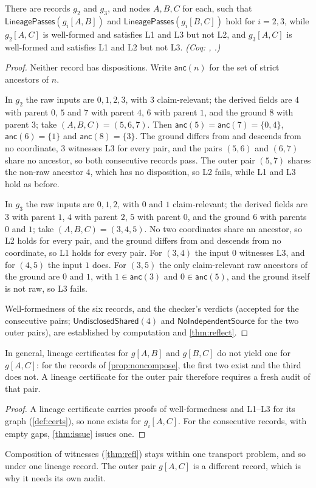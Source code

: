 \begin{prop}\label{prop:noncompose}
There are records $g_2$ and $g_3$, and nodes $A,B,C$ for each, such that $\mathsf{LineagePasses}(g_i[A,B])$ and $\mathsf{LineagePasses}(g_i[B,C])$ hold for $i = 2,3$, while $g_2[A,C]$ is well-formed and satisfies L1 and L3 but not L2, and $g_3[A,C]$ is well-formed and satisfies L1 and L2 but not L3. \emph{(Coq: , .)}
\end{prop}
\begin{proof}
Neither record has dispositions. Write $\mathsf{anc}(n)$ for the set of strict ancestors of $n$.

In $g_2$ the raw inputs are $0,1,2,3$, with $3$ claim-relevant; the derived fields are $4$ with parent $0$, $5$ and $7$ with parent $4$, $6$ with parent $1$, and the ground $8$ with parent $3$; take $(A,B,C) = (5,6,7)$. Then $\mathsf{anc}(5) = \mathsf{anc}(7) = \{0,4\}$, $\mathsf{anc}(6) = \{1\}$ and $\mathsf{anc}(8) = \{3\}$. The ground differs from and descends from no coordinate, $3$ witnesses L3 for every pair, and the pairs $(5,6)$ and $(6,7)$ share no ancestor, so both consecutive records pass. The outer pair $(5,7)$ shares the non-raw ancestor $4$, which has no disposition, so L2 fails, while L1 and L3 hold as before.

In $g_3$ the raw inputs are $0,1,2$, with $0$ and $1$ claim-relevant; the derived fields are $3$ with parent $1$, $4$ with parent $2$, $5$ with parent $0$, and the ground $6$ with parents $0$ and $1$; take $(A,B,C) = (3,4,5)$. No two coordinates share an ancestor, so L2 holds for every pair, and the ground differs from and descends from no coordinate, so L1 holds for every pair. For $(3,4)$ the input $0$ witnesses L3, and for $(4,5)$ the input $1$ does. For $(3,5)$ the only claim-relevant raw ancestors of the ground are $0$ and $1$, with $1 \in \mathsf{anc}(3)$ and $0 \in \mathsf{anc}(5)$, and the ground itself is not raw, so L3 fails.

Well-formedness of the six records, and the checker's verdicts (accepted for the consecutive pairs; $\mathsf{UndisclosedShared}(4)$ and $\mathsf{NoIndependentSource}$ for the two outer pairs), are established by computation and \cref{thm:reflect}.
\end{proof}

\begin{cor}\label{cor:freshaudit}
In general, lineage certificates for $g[A,B]$ and $g[B,C]$ do not yield one for $g[A,C]$: for the records of \cref{prop:noncompose}, the first two exist and the third does not. A lineage certificate for the outer pair therefore requires a fresh audit of that pair.
\end{cor}
\begin{proof}
A lineage certificate carries proofs of well-formedness and L1--L3 for its graph (\cref{def:certs}), so none exists for $g_i[A,C]$. For the consecutive records, with empty gaps, \cref{thm:issue} issues one.
\end{proof}
Composition of witnesses (\cref{thm:refl}) stays within one transport problem, and so under one lineage record. The outer pair $g[A,C]$ is a different record, which is why it needs its own audit.

